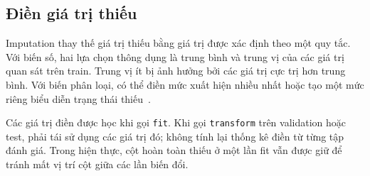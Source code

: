\subsection{Điền giá trị thiếu}
\label{subsec:2_2_1}
Imputation thay thế giá trị thiếu bằng giá trị được xác định theo một quy tắc. Với biến số, hai lựa chọn thông dụng là trung bình và trung vị của các giá trị quan sát trên train. Trung vị ít bị ảnh hưởng bởi các giá trị cực trị hơn trung bình. Với biến phân loại, có thể điền mức xuất hiện nhiều nhất hoặc tạo một mức riêng biểu diễn trạng thái thiếu~\cite{sklearn-imputer}.

Các giá trị điền được học khi gọi \texttt{fit}. Khi gọi \texttt{transform} trên validation hoặc test, phải tái sử dụng các giá trị đó; không tính lại thống kê điền từ từng tập đánh giá. Trong hiện thực, cột hoàn toàn thiếu ở một lần fit vẫn được giữ để tránh mất vị trí cột giữa các lần biến đổi.
